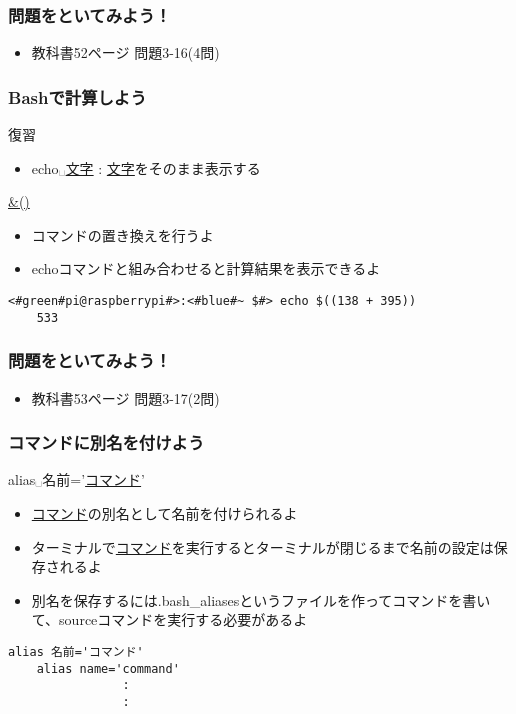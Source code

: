 \begin{frame}
    \frametitle{問題をといてみよう！}
    \begin{itemize}
        \item 教科書52ページ 問題3-16(4問)
    \end{itemize}
\end{frame}

\begin{frame}[fragile]
    \frametitle{Bashで計算しよう}
    復習
    \begin{itemize}
        \item echo␣\underline{文字} : \underline{文字}をそのまま表示する
    \end{itemize}
    \underline{\&()}
    \begin{itemize}
        \item コマンドの置き換えを行うよ
        \item echoコマンドと組み合わせると計算結果を表示できるよ
    \end{itemize}
    \begin{lstlisting}[title=echo コマンドでの計算, label=cmdsbs:calc]
    <#green#pi@raspberrypi#>:<#blue#~ $#> echo $((138 + 395))
    533
    \end{lstlisting}
\end{frame}

\begin{frame}
    \frametitle{問題をといてみよう！}
    \begin{itemize}
        \item 教科書53ページ 問題3-17(2問)
    \end{itemize}
\end{frame}

\begin{frame}[fragile]
    \frametitle{コマンドに別名を付けよう}
    alias␣名前='\underline{コマンド}'
    \begin{itemize}
        \item \underline{コマンド}の別名として名前を付けられるよ
    \end{itemize}
    \begin{itemize}
        \item ターミナルで\underline{コマンド}を実行するとターミナルが閉じるまで名前の設定は保存されるよ
        \item 別名を保存するには.bash\_aliasesというファイルを作ってコマンドを書いて、sourceコマンドを実行する必要があるよ
    \end{itemize}
    \begin{lstlisting}[title=\textasciitilde/.bash\_aliasesの書き方, label=bashAliasesGrammar1]
    alias 名前='コマンド'
    alias name='command'
                :
                :
    \end{lstlisting}
\end{frame}

